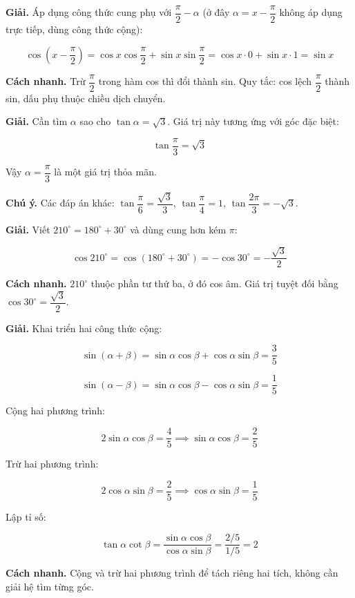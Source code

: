 \documentclass[11pt, a4paper]{article}
\begin{document}
\begin{dapan}[4 — Đáp án C]
\textbf{Giải.} Áp dụng công thức cung phụ với $\dfrac{\pi}{2} - \alpha$ (ở đây $\alpha = x - \dfrac{\pi}{2}$ không áp dụng trực tiếp, dùng công thức cộng):

$$\cos\!\left(x - \frac{\pi}{2}\right) = \cos x\cos\frac{\pi}{2} + \sin x\sin\frac{\pi}{2} = \cos x \cdot 0 + \sin x \cdot 1 = \sin x$$

\textbf{Cách nhanh.} Trừ $\dfrac{\pi}{2}$ trong hàm cos thì đổi thành sin. Quy tắc: cos lệch $\dfrac{\pi}{2}$ thành sin, dấu phụ thuộc chiều dịch chuyển.
\end{dapan}

\begin{dapan}[5 — Đáp án B]
\textbf{Giải.} Cần tìm $\alpha$ sao cho $\tan\alpha = \sqrt{3}$. Giá trị này tương ứng với góc đặc biệt:

$$\tan\frac{\pi}{3} = \sqrt{3}$$

Vậy $\alpha = \dfrac{\pi}{3}$ là một giá trị thỏa mãn.

\textbf{Chú ý.} Các đáp án khác: $\tan\dfrac{\pi}{6} = \dfrac{\sqrt{3}}{3}$, $\tan\dfrac{\pi}{4} = 1$, $\tan\dfrac{2\pi}{3} = -\sqrt{3}$.
\end{dapan}

\begin{dapan}[6 — Đáp án D]
\textbf{Giải.} Viết $210^\circ = 180^\circ + 30^\circ$ và dùng cung hơn kém $\pi$:

$$\cos 210^\circ = \cos(180^\circ + 30^\circ) = -\cos 30^\circ = -\frac{\sqrt{3}}{2}$$

\textbf{Cách nhanh.} $210^\circ$ thuộc phần tư thứ ba, ở đó cos âm. Giá trị tuyệt đối bằng $\cos 30^\circ = \dfrac{\sqrt{3}}{2}$.
\end{dapan}

\begin{dapan}[7 — Đáp án A]
\textbf{Giải.} Khai triển hai công thức cộng:

$$\sin(\alpha+\beta) = \sin\alpha\cos\beta + \cos\alpha\sin\beta = \frac{3}{5}$$

$$\sin(\alpha-\beta) = \sin\alpha\cos\beta - \cos\alpha\sin\beta = \frac{1}{5}$$

Cộng hai phương trình:

$$2\sin\alpha\cos\beta = \frac{4}{5} \implies \sin\alpha\cos\beta = \frac{2}{5}$$

Trừ hai phương trình:

$$2\cos\alpha\sin\beta = \frac{2}{5} \implies \cos\alpha\sin\beta = \frac{1}{5}$$

Lập tỉ số:

$$\tan\alpha\cot\beta = \frac{\sin\alpha\cos\beta}{\cos\alpha\sin\beta} = \frac{2/5}{1/5} = 2$$

\textbf{Cách nhanh.} Cộng và trừ hai phương trình để tách riêng hai tích, không cần giải hệ tìm từng góc.
\end{dapan}
\end{document}
